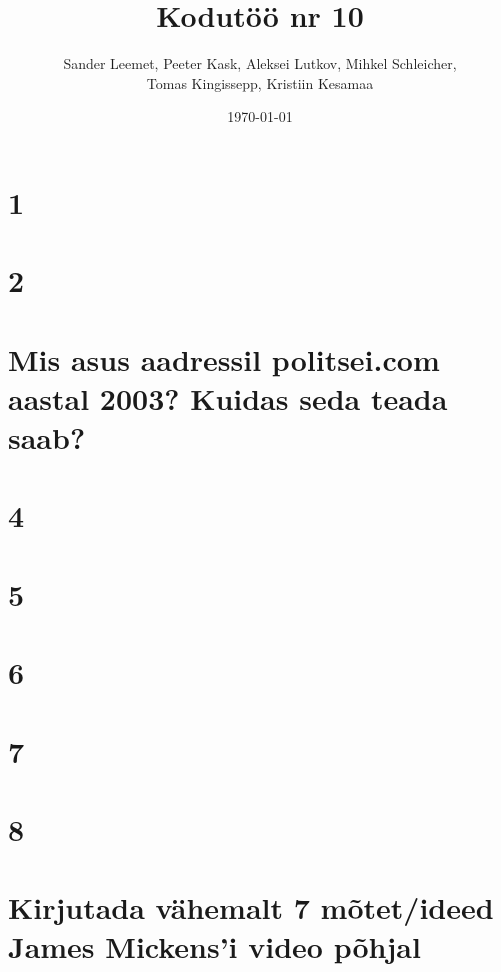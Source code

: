 \documentclass{article}
\title{Kodutöö nr 10}
\author{Sander Leemet, Peeter Kask, Aleksei Lutkov, Mihkel Schleicher,\\ Tomas Kingissepp, Kristiin Kesamaa}
\date{\today}
\begin{document}
\maketitle

\section{1}
\section{2}

\section{Mis asus aadressil politsei.com aastal 2003? Kuidas seda teada saab?}

\section{4}
\section{5}
\section{6}
\section{7}
\section{8}
\section{Kirjutada vähemalt 7 mõtet/ideed James Mickens'i video põhjal}
\end{document}
